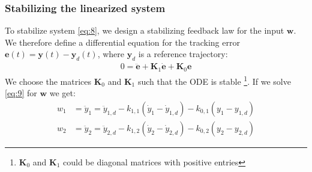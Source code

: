 \documentclass[a4paper,11pt,headings=standardclasses,parskip=half]{scrartcl}
\newcommand{\y}{\mathbf{y}}
\begin{document}
\subsubsection{Stabilizing the linearized system}
To stabilize system \eqref{eq:8}, we design a stabilizing feedback law for the input $\mathbf{w}$. We therefore define a differential equation for the tracking error $\mathbf{e}(t)=\y(t)-\y_d(t)$, where $\y_d$ is a reference trajectory:
\begin{align}
\label{eq:9}
0 = \ddot{\mathbf{e}} + \mathbf{K}_1 \dot{\mathbf{e}}+\mathbf{K}_0 \mathbf{e}
\end{align}
We choose the matrices $\mathbf{K}_0$ and $\mathbf{K}_1$ such that the ODE is stable \footnote{$\mathbf{K}_0$ and $\mathbf{K}_1$ could be diagonal matrices with positive entries}.
If we solve \eqref{eq:9} for $\mathbf{w}$ we get:
\begin{subequations}
\label{eq:10}
\begin{align}
w_1 &= \ddot{y}_1 = \ddot{y}_{1,d} - k_{1,1}(\dot{y}_1-\dot{y}_{1,d})-k_{0,1}(y_1-y_{1,d}) \\
w_2 &= \ddot{y}_2 = \ddot{y}_{2,d} - k_{1,2}(\dot{y}_2-\dot{y}_{2,d})-k_{0,2}(y_2-y_{2,d})
\end{align}
\end{subequations}
\end{document}
